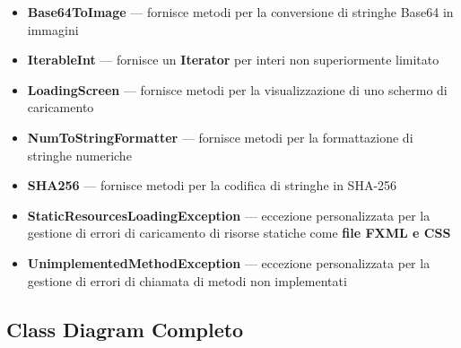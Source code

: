 \begin{itemize}
  \item \textbf{Base64ToImage} --- fornisce metodi per la conversione di stringhe Base64 in immagini
  \item \textbf{IterableInt} --- fornisce un \textbf{Iterator} per interi non superiormente limitato
  \item \textbf{LoadingScreen} --- fornisce metodi per la visualizzazione di uno schermo di caricamento
  \item \textbf{NumToStringFormatter} --- fornisce metodi per la formattazione di stringhe numeriche
  \item \textbf{SHA256} --- fornisce metodi per la codifica di stringhe in SHA-256
  \item \textbf{StaticResourcesLoadingException} --- eccezione personalizzata per la gestione di errori 
  di caricamento di risorse statiche come \textbf{file FXML e CSS}
  \item \textbf{UnimplementedMethodException} --- eccezione personalizzata per la gestione di errori
  di chiamata di metodi non implementati
\end{itemize}


\subsection{Class Diagram Completo}

